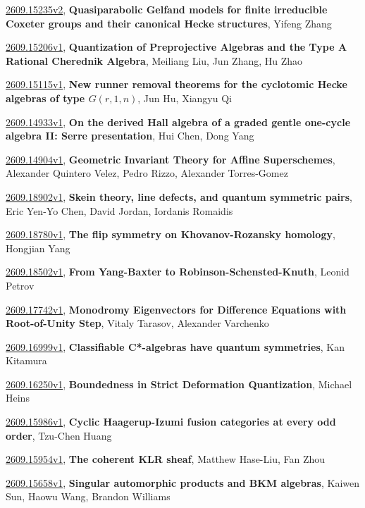 \documentclass[9pt, a4paper]{article}
\theoremstyle{plain}
\theoremstyle{definition}
\theoremstyle{remark}
\newcommand{\arxiv}[3]{\href{https://arxiv.org/abs/#1}{#1}, \textbf{\textcolor{arxivblue}{#2}}, #3}
\begin{document}
\arxiv{2609.15235v2}{Quasiparabolic Gelfand models for finite irreducible Coxeter groups and their canonical Hecke structures}{Yifeng Zhang}

\arxiv{2609.15206v1}{Quantization of Preprojective Algebras and the Type A Rational Cherednik Algebra}{Meiliang Liu, Jun Zhang, Hu Zhao}

\arxiv{2609.15115v1}{New runner removal theorems for the cyclotomic Hecke algebras of type $G(r,1,n)$}{Jun Hu, Xiangyu Qi}

\arxiv{2609.14933v1}{On the derived Hall algebra of a graded gentle one-cycle algebra II: Serre presentation}{Hui Chen, Dong Yang}

\arxiv{2609.14904v1}{Geometric Invariant Theory for Affine Superschemes}{Alexander Quintero Velez, Pedro Rizzo, Alexander Torres-Gomez}

\arxiv{2609.18902v1}{Skein theory, line defects, and quantum symmetric pairs}{Eric Yen-Yo Chen, David Jordan, Iordanis Romaidis}

\arxiv{2609.18780v1}{The flip symmetry on Khovanov-Rozansky homology}{Hongjian Yang}

\arxiv{2609.18502v1}{From Yang-Baxter to Robinson-Schensted-Knuth}{Leonid Petrov}

\arxiv{2609.17742v1}{Monodromy Eigenvectors for Difference Equations with Root-of-Unity Step}{Vitaly Tarasov, Alexander Varchenko}

\arxiv{2609.16999v1}{Classifiable C*-algebras have quantum symmetries}{Kan Kitamura}

\arxiv{2609.16250v1}{Boundedness in Strict Deformation Quantization}{Michael Heins}

\arxiv{2609.15986v1}{Cyclic Haagerup-Izumi fusion categories at every odd order}{Tzu-Chen Huang}

\arxiv{2609.15954v1}{The coherent KLR sheaf}{Matthew Hase-Liu, Fan Zhou}

\arxiv{2609.15658v1}{Singular automorphic products and BKM algebras}{Kaiwen Sun, Haowu Wang, Brandon Williams}

\end{document}
